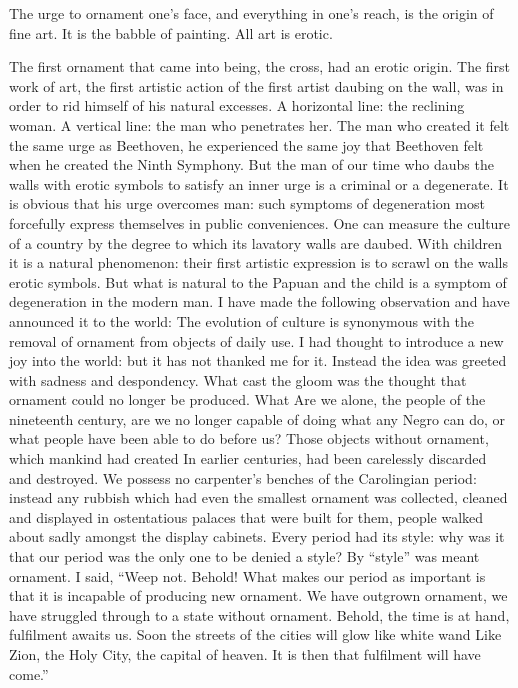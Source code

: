 \documentclass[a4paper]{article}
\begin{document}
The urge to ornament one’s face, and everything in one’s reach, is the origin of fine art. It is the babble of painting. All art is erotic.

The first ornament that came into being, the cross, had an erotic origin. The first work of art, the first artistic action of the first artist daubing on the wall, was in order to rid himself of his natural excesses. A horizontal line: the reclining woman. A vertical line: the man who penetrates her. The man who created it felt the same urge as Beethoven, he experienced the same joy that Beethoven felt when he created the Ninth Symphony.
But the man of our time who daubs the walls with erotic symbols to satisfy an inner urge is a criminal or a degenerate. It is obvious that his urge overcomes man: such symptoms of degeneration most forcefully express themselves in public conveniences. One can measure the culture of a country by the degree to which its lavatory walls are daubed. With children it is a natural phenomenon: their first artistic expression is to scrawl on the walls erotic symbols. But what is natural to the Papuan and the child is a symptom of degeneration in the modern man. I have made the following observation and have announced it to the world: The evolution of culture is synonymous with the removal of ornament from objects of daily use. I had thought to introduce a new joy into the world: but it has not thanked me for it. Instead the idea was greeted with sadness and despondency. What cast the gloom was the thought that ornament could no longer be produced. What Are we alone, the people of the nineteenth century, are we no longer capable of doing what any Negro can do, or what people have been able to do before us?
Those objects without ornament, which mankind had created In earlier centuries, had been carelessly discarded and destroyed. We possess no carpenter’s benches of the Carolingian period: instead any rubbish which had even the smallest ornament was collected, cleaned and displayed in ostentatious palaces that were built for them, people walked about sadly amongst the display cabinets. Every period had its style: why was it that our period was the only one to be denied a style? By “style” was meant ornament. I said, “Weep not. Behold! What makes our period as important is that it is incapable of producing new ornament. We have outgrown ornament, we have struggled through to a state without ornament. Behold, the time is at hand, fulfilment awaits us. Soon the streets of the cities will glow like white wand Like Zion, the Holy City, the capital of heaven. It is then that fulfilment will have come.”
\end{document}
